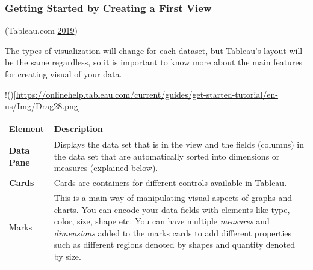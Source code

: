 \documentclass[]{book}
\begin{document}
\hypertarget{getting-started-by-creating-a-first-view}{%
\subsubsection{Getting Started by Creating a First View}\label{getting-started-by-creating-a-first-view}}

(Tableau.com \protect\hyperlink{ref-Tableau_Build_Manual}{2019})

The types of visualization will change for each dataset, but Tableau's layout will be the same regardless, so it is important to know more about the main features for creating visual of your data.

!(){[}\url{https://onlinehelp.tableau.com/current/guides/get-started-tutorial/en-us/Img/Drag28.png}{]}

\begin{longtable}[]{@{}ll@{}}
\toprule
\begin{minipage}[b]{0.15\columnwidth}\raggedright
\textbf{Element}\strut
\end{minipage} & \begin{minipage}[b]{0.80\columnwidth}\raggedright
\textbf{Description}\strut
\end{minipage}\tabularnewline
\midrule
\endhead
\begin{minipage}[t]{0.15\columnwidth}\raggedright
\textbf{Data Pane}\strut
\end{minipage} & \begin{minipage}[t]{0.80\columnwidth}\raggedright
Displays the data set that is in the view and the fields (columns) in the data set that are automatically sorted into dimensions or measures (explained below).\strut
\end{minipage}\tabularnewline
\begin{minipage}[t]{0.15\columnwidth}\raggedright
\textbf{Cards}\strut
\end{minipage} & \begin{minipage}[t]{0.80\columnwidth}\raggedright
Cards are containers for different controls available in Tableau.\strut
\end{minipage}\tabularnewline
\begin{minipage}[t]{0.15\columnwidth}\raggedright
Marks\strut
\end{minipage} & \begin{minipage}[t]{0.80\columnwidth}\raggedright
This is a main way of manipulating visual aspects of graphs and charts. You can encode your data fields with elements like type, color, size, shape etc. You can have multiple \emph{measures} and \emph{dimensions} added to the marks cards to add different properties such as different regions denoted by shapes and quantity denoted by size.\strut

\end{minipage}
\end{longtable}
\end{document}
